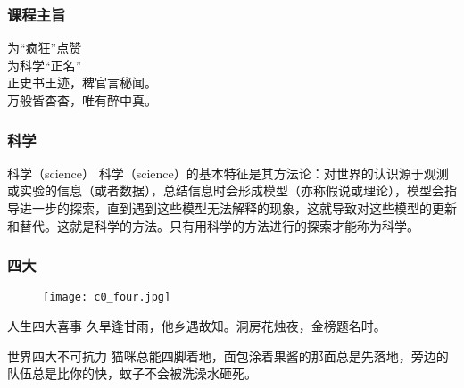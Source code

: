\begin{frame}[fragile]
  \frametitle{课程主旨}
  \begin{center}
  {\Huge 为“疯狂”点赞\\
    \vspace{0.5cm}
    为科学“正名”}\\
  \vspace{1cm}
  {\Large 正史书王迹，稗官言秘闻。\\
    \vspace{0.2cm}
    万般皆杳杳，唯有醉中真。}
\end{center}
\end{frame}

\begin{frame}
  \frametitle{科学}
  \begin{block}{科学（science）}
科学（science）的基本特征是其方法论：对世界的认识源于观测或实验的信息（或者数据），总结信息时会形成模型（亦称假说或理论），模型会指导进一步的探索，直到遇到这些模型无法解释的现象，这就导致对这些模型的更新和替代。这就是科学的方法。只有用科学的方法进行的探索才能称为科学。
  \end{block}
\end{frame}

\begin{frame}
  \frametitle{四大}
  \vspace{-0.5em}
  \begin{figure}
    \centering
    \texttt{[image: c0\_four.jpg]}
  \end{figure}
  \vspace{-0.5em}
  \begin{block}{人生四大喜事}
    久旱逢甘雨，他乡遇故知。洞房花烛夜，金榜题名时。
  \end{block}
  \pause
  \begin{block}{世界四大不可抗力}
    猫咪总能四脚着地，面包涂着果酱的那面总是先落地，旁边的队伍总是比你的快，蚊子不会被洗澡水砸死。
  \end{block}
\end{frame}

